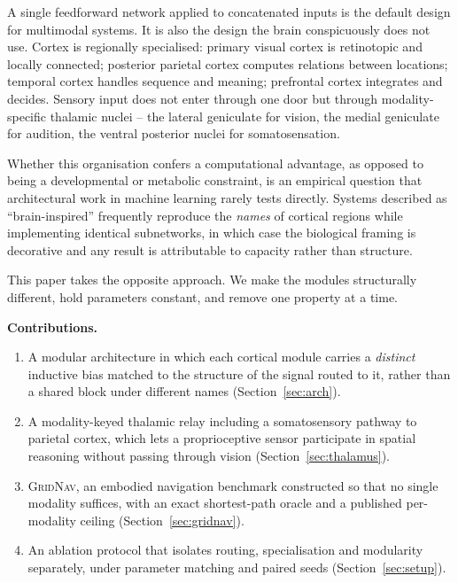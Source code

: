 \documentclass[conference]{IEEEtran}
\begin{document}
A single feedforward network applied to concatenated inputs is the default
design for multimodal systems. It is also the design the brain conspicuously
does not use. Cortex is regionally specialised: primary visual cortex is
retinotopic and locally connected; posterior parietal cortex computes
relations between locations; temporal cortex handles sequence and meaning;
prefrontal cortex integrates and decides. Sensory input does not enter through
one door but through modality-specific thalamic nuclei -- the lateral
geniculate for vision, the medial geniculate for audition, the ventral
posterior nuclei for somatosensation.

Whether this organisation confers a computational advantage, as opposed to
being a developmental or metabolic constraint, is an empirical question that
architectural work in machine learning rarely tests directly. Systems
described as ``brain-inspired'' frequently reproduce the \emph{names} of
cortical regions while implementing identical subnetworks, in which case the
biological framing is decorative and any result is attributable to capacity
rather than structure.

This paper takes the opposite approach. We make the modules structurally
different, hold parameters constant, and remove one property at a time.

\textbf{Contributions.}
\begin{enumerate}
  \item A modular architecture in which each cortical module carries a
        \emph{distinct} inductive bias matched to the structure of the signal
        routed to it, rather than a shared block under different names
        (Section~\ref{sec:arch}).
  \item A modality-keyed thalamic relay including a somatosensory pathway to
        parietal cortex, which lets a proprioceptive sensor participate in
        spatial reasoning without passing through vision
        (Section~\ref{sec:thalamus}).
  \item \textsc{GridNav}, an embodied navigation benchmark constructed so that
        no single modality suffices, with an exact shortest-path oracle and a
        published per-modality ceiling (Section~\ref{sec:gridnav}).
  \item An ablation protocol that isolates routing, specialisation and
        modularity separately, under parameter matching and paired seeds
        (Section~\ref{sec:setup}).
\end{enumerate}
\end{document}
